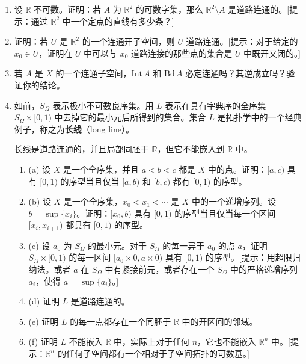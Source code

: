 \begin{enumerate}
\item 设 $\mathbb{R}$ 不可数。证明：若 $A$ 为 $\mathbb{R}^{2}$ 的可数字集，那么 $\mathbb{R}^{2}\setminus A$ 是道路连通的。[提示：通过 $\mathbb{R}^{2}$ 中一个定点的直线有多少条？]
\item 证明：若 $U$ 是 $\mathbb{R}^{2}$ 的一个连通开子空间，则 $U$ 道路连通。[提示：对于给定的 $x_{0}\in U$，证明在 $U$ 中可以与 $x_{0}$ 道路连接的那些点的集合是 $U$ 中既开又闭的。]
\item 若 $A$ 是 $X$ 的一个连通子空间，$\mathrm{Int}\,A$ 和 $\mathrm{Bd}\,A$ 必定连通吗？其逆成立吗？验证你的结论。
\item 如前，$S_{\Omega}$ 表示极小不可数良序集。用 $L$ 表示在具有字典序的全序集 $S_{\Omega}\times[0,1)$ 中去掉它的最小元后所得到的集合。集合 $L$ 是拓扑学中的一个经典例子，称之为\textbf{长线}（long line）。

\begin{theorem}
长线是道路连通的，并且局部同胚于 $\mathbb{R}$，但它不能嵌入到 $\mathbb{R}$ 中。
\end{theorem}
\begin{enumerate}
\item (a) 设 $X$ 是一个全序集，并且 $a<b<c$ 都是 $X$ 中的点。证明：$[a,c)$ 具有 $[0,1)$ 的序型当且仅当 $[a,b)$ 和 $[b,c)$ 都有 $[0,1)$ 的序型。
\item (b) 设 $X$ 是一个全序集，$x_{0}<x_{1}<\cdots$ 是 $X$ 中的一个递增序列。设 $b=\sup\{x_{i}\}$。证明：$[x_{0},b)$ 具有 $[0,1)$ 的序型当且仅当每一个区间 $[x_{i},x_{i+1})$ 都具有 $[0,1)$ 的序型。
\item (c) 设 $a_{0}$ 为 $S_{\Omega}$ 的最小元。对于 $S_{\Omega}$ 的每一异于 $a_{0}$ 的点 $a$，证明 $S_{\Omega}\times[0,1)$ 的每一区间 $[a_{0}\times 0,a\times 0)$ 具有 $[0,1)$ 的序型。[提示：用超限归纳法。或者 $a$ 在 $S_{\Omega}$ 中有紧接前元，或者存在一个 $S_{\Omega}$ 中的严格递增序列 $a_{i}$，使得 $a=\sup\{a_{i}\}$。]
\item (d) 证明 $L$ 是道路连通的。
\item (e) 证明 $L$ 的每一点都存在一个同胚于 $\mathbb{R}$ 中的开区间的邻域。
\item (f) 证明 $L$ 不能嵌入 $\mathbb{R}$ 中，实际上对于任何 $n$，它也不能嵌入 $\mathbb{R}^{n}$ 中。[提示：$\mathbb{R}^{n}$ 的任何子空间都有一个相对于子空间拓扑的可数基。]
\end{enumerate}
\end{enumerate}